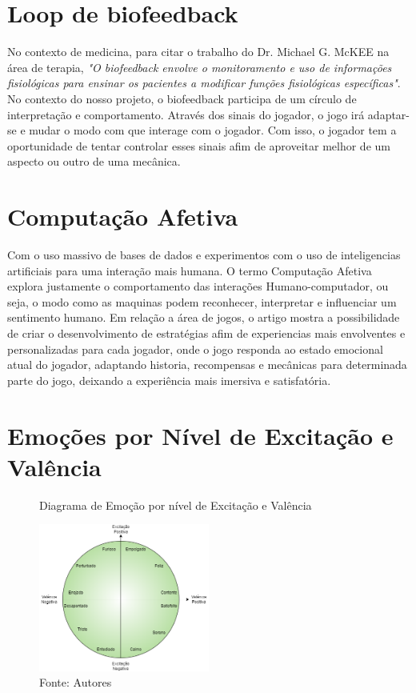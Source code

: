 \section{Loop de biofeedback}
No contexto de medicina, para citar o trabalho do Dr. Michael G. McKEE na área de terapia, 
\textit{"O biofeedback envolve o monitoramento e uso de informações fisiológicas para ensinar os pacientes a modificar funções fisiológicas específicas"}\cite{biofeedback2008biofeedback}. No contexto do nosso projeto, o biofeedback participa de um círculo de interpretação e comportamento. Através dos sinais do jogador, o jogo irá adaptar-se e mudar o modo com que interage com o jogador. Com isso, o jogador tem a oportunidade de tentar controlar esses sinais afim de aproveitar melhor de um aspecto ou outro de uma mecânica. 

\section{Computação Afetiva}
Com o uso massivo de bases de dados e experimentos com o uso de inteligencias artificiais para uma interação mais humana. O termo Computação Afetiva explora justamente o comportamento das interações Humano-computador, ou seja, o modo como as maquinas podem reconhecer, interpretar e influenciar um sentimento humano. Em relação a área de jogos, o artigo \cite{filipa2019emovere} mostra a possibilidade de criar o desenvolvimento de estratégias afim de experiencias mais envolventes e personalizadas para cada jogador, onde o jogo responda ao estado emocional atual do jogador, adaptando historia, recompensas e mecânicas para determinada parte do jogo, deixando a experiência mais imersiva e satisfatória.

\break
\section{Emoções por Nível de Excitação e Valência}

 \begin{figure}[h]
    \centering
    \caption{Diagrama de Emoção por nível de Excitação e Valência}
    \centering
    \includegraphics[width=0.5\textwidth]{Figuras/diagrama-emocional.drawio.png}
    \caption*{Fonte: Autores}
    \label{fig:diagrama_emocional}
\end{figure}

